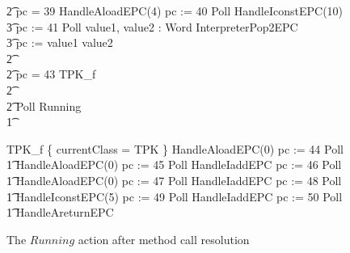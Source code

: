 \begin{figure}[t]
\begin{circus}
    \t2 {} \circelse pc = 39 \circthen HandleAloadEPC(4) \circseq pc := 40 \circseq Poll \circseq HandleIconstEPC(10) \circseq \\
    \t3 pc := 41 \circseq Poll \circseq \circvar value1, value2 : Word \circspot InterpreterPop2EPC \circseq \\
    \t3 pc := \IF value1 \leq value2   \\
    \t2 {} \cdots {} \\
    \t2 {} \circelse pc = 43 \circthen TPK\_f \\
    \t2 {} \cdots {} \\
    \t2 \circfi \circseq Poll \circseq Running \\
    \t1 \circfi
  \end{circus}
  \begin{circus}
    TPK\_f \circdef \{ currentClass = TPK \} \circseq HandleAloadEPC(0) \circseq pc := 44 \circseq Poll \circseq \\
    \t1 HandleAloadEPC(0) \circseq pc := 45 \circseq Poll \circseq HandleIaddEPC \circseq pc := 46 \circseq Poll \circseq \\
    \t1 HandleAloadEPC(0) \circseq pc := 47 \circseq Poll \circseq HandleIaddEPC \circseq pc := 48 \circseq Poll \circseq \\
    \t1 HandleIconstEPC(5) \circseq pc := 49 \circseq Poll \circseq HandleIaddEPC \circseq pc := 50 \circseq Poll \circseq \\
    \t1 HandleAreturnEPC
  \end{circus}
  \caption{The $Running$ action after method call resolution}
  \label{method-call-resolution-example-figure}
\end{figure}

